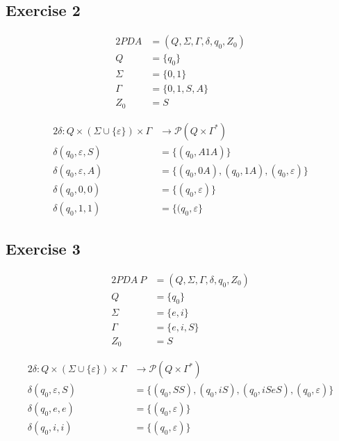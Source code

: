 \documentclass[docid=TP09]{tcom_TP}
\begin{document}
{\subsection{Exercise 2} \label{TP09_2}
\begin{center}
\begin{minipage}[c]{0.30\textwidth}
\begin{alignat*}{2}
	PDA    &= (Q, \Sigma, \Gamma, \delta, q_0, Z_0)\\
	Q      &= \{q_0\}\\
	\Sigma &= \{0,1\}\\
	\Gamma &= \{0,1,S,A\}\\
	Z_0    &= S
\end{alignat*}
\end{minipage}%
\begin{minipage}[c]{0.60\textwidth}
\begin{alignat*}{2}
	\delta \colon Q \times (\Sigma \cup \{\varepsilon\}) \times \Gamma & \rightarrow \mathscr{P}(Q \times \Gamma^*)\\
	\delta(q_0, \varepsilon, S) &= \{(q_0, A1A)\} \\
	\delta(q_0, \varepsilon, A) &= \{(q_0,0A), (q_0, 1A),(q_0,\varepsilon)\}\\
	\delta(q_0, 0, 0) &= \{(q_0, \varepsilon)\}\\
	\delta(q_0, 1, 1) &= \{(q_0, \varepsilon\}
\end{alignat*}
\end{minipage}
\end{center}
\subsection{Exercise 3} \label{TP09_3}
\begin{center}
\begin{minipage}[c]{0.4\textwidth}
\begin{alignat*}{2}
	PDA ~ P &= (Q,\Sigma,\Gamma,\delta, q_0, Z_0)\\
	Q       &= \{q_0\}\\
	\Sigma  &= \{e,i\}\\
	\Gamma  &= \{e,i,S\}\\
	Z_0     &= S
\end{alignat*}
\end{minipage}%
\begin{minipage}[c]{0.6\textwidth}
\begin{alignat*}{2}
	\delta \colon Q \times (\Sigma \cup \{\varepsilon\}) \times \Gamma & \rightarrow \mathscr{P}(Q \times \Gamma ^*)\\
	\delta (q_0,\varepsilon ,S) &=\{(q_0,SS),(q_0,iS),(q_0,iSeS), (q_0, \varepsilon)\}\\
	\delta (q_0,e,e)&=\{(q_0,\varepsilon)\}\\
	\delta (q_0,i,i)&=\{(q_0,\varepsilon)\}
\end{alignat*}
\end{minipage}
\end{center}
}
\end{document}
